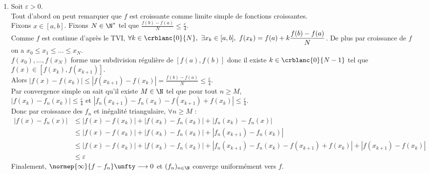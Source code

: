 \documentclass{book}
\begin{document}
\begin{enumerate}[leftmargin=*]
		On sait en vertu de la convergence simple de $(f_n)_{n\in \N}$ que $\displaystyle\bigcap_{n\in \N}F_n=\emptyset$. Donc par la contraposé du lemme des compacts emboîtés (cf. \ref{Lemme des compacts emboîtés}), $\exists N\in \N,\ F_N=\emptyset$.\\
		Autrement dit, $\forall n\geq N,\ \forall x\in [a,b],\ 0\leq f(x)-f_n(x)\leq f(x)-f_N(x)<\varepsilon$ ou encore, $\forall n\geq N,\ \normep{\infty}{f-f_n}<\varepsilon$.\\
		Donc $(f_n)_{n\in \N}$ converge uniformément vers $f$ sur $[a,b]$.
		\item Soit $\varepsilon>0$.\\
		Tout d'abord on peut remarquer que $f$ est croissante comme limite simple de fonctions croissantes.\\
		Fixons $x\in [a,b]$. Fixons $N\in \N^*$ tel que $\displaystyle\frac{f(b)-f(a)}{N}\leq \frac{\varepsilon}{4}$.\\
		Comme $f$ est continue d'après le TVI, $\forall k\in \crblanc{0}{N},\ \exists x_k\in [a,b],\ f(x_k)=f(a)+\displaystyle k\frac{f(b)-f(a)}{N}$. De plus par croissance de $f$ on a $x_0\leq x_1\leq \dots\leq x_N$.\\
		$f(x_0),\dots,f(x_N)$ forme une subdivision régulière de $[f(a),f(b)]$ donc il existe $k\in \crblanc{0}{N-1}$ tel que $f(x)\in [f(x_k),f(x_{k+1})]$.\\
		Alors $|f(x)-f(x_k)|\leq |f(x_{k+1})-f(x_k)|=\displaystyle\frac{f(b)-f(a)}{N}\leq \frac{\varepsilon}{4}$.\\
		Par convergence simple on sait qu'il existe $M\in \N$ tel que pour tout $n\geq M$,\\
		$|f(x_k)-f_n(x_k)|\leq \displaystyle\frac{\varepsilon}{4}$ et $|f_n(x_{k+1})-f_n(x_k)-f(x_{k+1})+f(x_k)|\leq \displaystyle\frac{\varepsilon}{4}$.\\
		Donc par croissance des $f_n$ et inégalité triangulaire, $\forall n\geq M$ :
		\begin{align*}
			|f(x)-f_n(x)|&\leq |f(x)-f(x_k)|+|f(x_k)-f_n(x_k)|+|f_n(x_k)-f_n(x)|\\
			&\leq |f(x)-f(x_k)|+|f(x_k)-f_n(x_k)|+|f_n(x_{k+1})-f_n(x_k)|\\
			&\leq |f(x)-f(x_k)|+|f(x_k)-f_n(x_k)|+|f_n(x_{k+1})-f_n(x_k)-f(x_{k+1})+f(x_k)|+|f(x_{k+1})-f(x_k)|\\
			&\leq \varepsilon
		\end{align*}
		Finalement, $\normep{\infty}{f-f_n}\unfty\longrightarrow 0$ et $(f_n)_{n\in \N}$ converge uniformément vers $f$.
	\end{enumerate}
	
\end{document}
